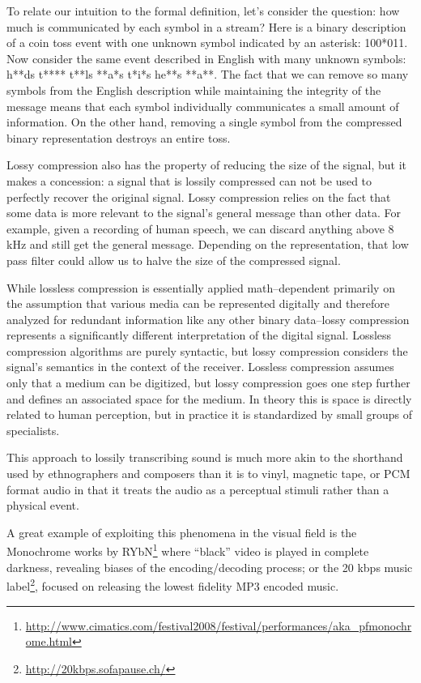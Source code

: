 \documentclass{thesis}
\begin{document}
	To relate our intuition to the formal definition, let's consider the question: how much is communicated by each symbol in a stream? Here is a binary description of a coin toss event with one unknown symbol indicated by an asterisk: 100*011. Now consider the same event described in English with many unknown symbols: h**ds t**** t**ls **a*s t*i*s he**s **a**. The fact that we can remove so many symbols from the English description while maintaining the integrity of the message means that each symbol individually communicates a small amount of information. On the other hand, removing a single symbol from the compressed binary representation destroys an entire toss.
	
	Lossy compression also has the property of reducing the size of the signal, but it makes a concession: a signal that is lossily compressed can not be used to perfectly recover the original signal. Lossy compression relies on the fact that some data is more relevant to the signal's general message than other data. For example, given a recording of human speech, we can discard anything above 8 kHz and still get the general message. Depending on the representation, that low pass filter could allow us to halve the size of the compressed signal.
	
	While lossless compression is essentially applied math--dependent primarily on the assumption that various media can be represented digitally and therefore analyzed for redundant information like any other binary data--lossy compression represents a significantly different interpretation of the digital signal. Lossless compression algorithms are purely syntactic, but lossy compression considers the signal's semantics in the context of the receiver. Lossless compression assumes only that a medium can be digitized, but lossy compression goes one step further and defines an associated space for the medium. In theory this is space is directly related to human perception, but in practice it is standardized by small groups of specialists.
	
	This approach to lossily transcribing sound is much more akin to the shorthand used by ethnographers and composers than it is to vinyl, magnetic tape, or PCM format audio in that it treats the audio as a perceptual stimuli rather than a physical event.
	
	A great example of exploiting this phenomena in the visual field is the Monochrome works by RYbN\footnote{\url{http://www.cimatics.com/festival2008/festival/performances/aka_pfmonochrome.html}} where ``black'' video is played in complete darkness, revealing biases of the encoding/decoding process; or the 20 kbps music label\footnote{\url{http://20kbps.sofapause.ch/}}, focused on releasing the lowest fidelity MP3 encoded music.
	
\end{document}
